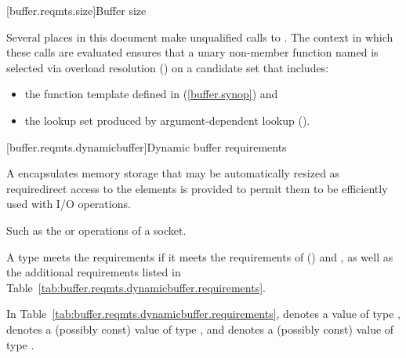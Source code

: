 [buffer.reqmts.size]{Buffer size}

\pnum
Several places in this document make unqualified calls to .
The context in which these calls are evaluated ensures that
a unary non-member function named 
is selected via overload resolution ()
on a candidate set that includes:

\begin{itemize}
\item the  function template defined in  (\ref{buffer.synop}) and
\item the lookup set produced by argument-dependent lookup ().
\end{itemize}


[buffer.reqmts.dynamicbuffer]{Dynamic buffer requirements}

\pnum
A  encapsulates memory storage that may be automatically resized as requiredirect access to the elements is provided to permit them to be efficiently used with I/O operations. \begin{note} Such as the  or  operations of a socket. \end{note}

\pnum
A type  meets the  requirements if it meets the requirements of  () and , as well as the additional requirements listed in Table~\ref{tab:buffer.reqmts.dynamicbuffer.requirements}.

\pnum
In Table~\ref{tab:buffer.reqmts.dynamicbuffer.requirements},
 denotes a value of type ,
 denotes a (possibly const) value of type ,
and  denotes a (possibly const) value of type .

